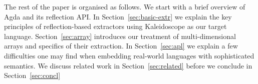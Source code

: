 \documentclass[acmsmall,review,anonymous]{acmart}\settopmatter{printfolios=true,printccs=false,printacmref=false}
\begin{document}
The rest of the paper is organised as follows.  We start with a brief
overview of Agda and its reflection API.  In Section~\ref{sec:basic-extr}
we explain the key principles of reflection-based extractors using
Kaleidoscope as our target language.  Section~\ref{sec:array} introduces
our treatment of multi-dimensional arrays and specifics of their
extraction.  In Section~\ref{sec:apl} we explain a few difficulties
one may find when embedding real-world languages with sophisticated
semantics.  We discuss related work in Section~\ref{sec:related}
before we conclude in Section~\ref{sec:concl}







%  
%  
%  
%  
\end{document}
